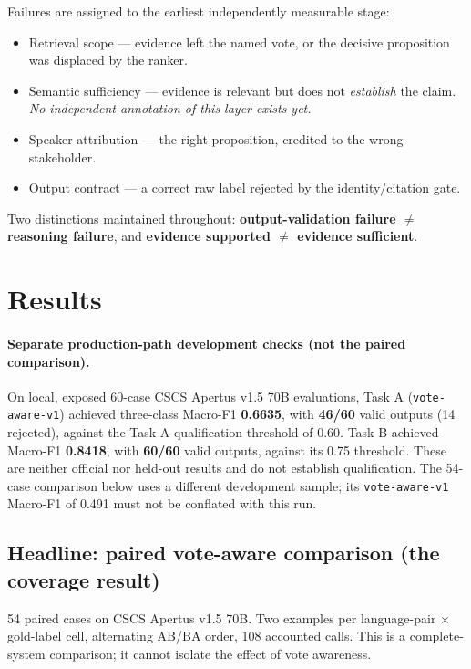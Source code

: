 \documentclass[10pt,a4paper]{article}
\begin{document}
Failures are assigned to the earliest independently measurable stage:
\begin{itemize}
\item[\textbf{L1}] Retrieval scope --- evidence left the named vote, or the decisive proposition was displaced by the ranker.
\item[\textbf{L2}] Semantic sufficiency --- evidence is relevant but does not \emph{establish} the claim. \emph{No independent annotation of this layer exists yet.}
\item[\textbf{L3}] Speaker attribution --- the right proposition, credited to the wrong stakeholder.
\item[\textbf{L4}] Output contract --- a correct raw label rejected by the identity/citation gate.
\end{itemize}

Two distinctions maintained throughout: \textbf{output-validation failure $\neq$ reasoning failure}, and \textbf{evidence supported $\neq$ evidence sufficient}.

\section{Results}

\paragraph{Separate production-path development checks (not the paired comparison).}
On local, exposed 60-case CSCS Apertus v1.5 70B evaluations, Task A (\texttt{vote-aware-v1}) achieved three-class Macro-F1 \textbf{0.6635}, with \textbf{46/60} valid outputs (14 rejected), against the Task A qualification threshold of 0.60. Task B achieved Macro-F1 \textbf{0.8418}, with \textbf{60/60} valid outputs, against its 0.75 threshold. These are neither official nor held-out results and do not establish qualification. The 54-case comparison below uses a different development sample; its \texttt{vote-aware-v1} Macro-F1 of 0.491 must not be conflated with this run.

\subsection{Headline: paired vote-aware comparison (the coverage result)}

54 paired cases on CSCS Apertus v1.5 70B. Two examples per language-pair $\times$ gold-label cell, alternating AB/BA order, 108 accounted calls. This is a complete-system comparison; it cannot isolate the effect of vote awareness.
\end{document}
